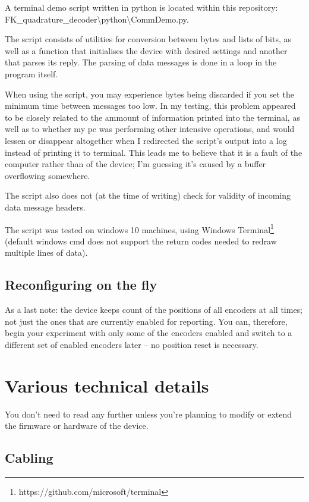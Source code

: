 \documentclass[twoside]{article}
\begin{document}
\noindent{}A terminal demo script written in python is located within this repository:\\ FK\_quadrature\_decoder\textbackslash{}python\textbackslash{}CommDemo.py.

The script consists of utilities for conversion between bytes and lists of bits, as well as a function that initialises the device with desired settings and another that parses its reply. The parsing of data messages is done in a loop in the program itself.

When using the script, you may experience bytes being discarded if you set the minimum time between messages too low. In my testing, this problem appeared to be closely related to the ammount of information printed into the terminal, as well as to whether my pc was performing other intensive operations, and would lessen or disappear altogether when I redirected the script's output into a log instead of printing it to terminal. This leads me to believe that it is a fault of the computer rather than of the device; I'm guessing it's caused by a buffer overflowing somewhere. 

The script also does not (at the time of writing) check for validity of incoming data message headers.

The script was tested on windows 10 machines, using Windows Terminal\footnote{https://github.com/microsoft/terminal} (default windows cmd does not support the return codes needed to redraw multiple lines of data).

\subsection{Reconfiguring on the fly}

As a last note: the device keeps count of the positions of all  encoders at all times; not just the ones that are currently enabled for reporting. You can, therefore, begin your experiment with only some of the encoders enabled and switch to a different set of enabled encoders later -- no position reset is necessary.

\newpage{}
\section{Various technical details}

You don't need to read any further unless you're planning to modify or extend the firmware or hardware of the device.

\subsection{Cabling}
\end{document}
